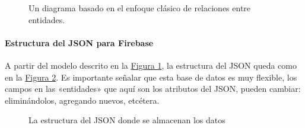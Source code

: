 \begin{figure}[htbp]
\centering
\capstart

\noindent{}
\caption{Un diagrama basado en el enfoque clásico de relaciones entre entidades.}\label{\detokenize{chapter_two/desc_cloudnao:entity-relationship-model-cn-firebase}}\end{figure}


\paragraph{Estructura del JSON para Firebase}
\label{\detokenize{chapter_two/desc_cloudnao:estructura-del-json-para-firebase}}

A partir del modelo descrito en la \hyperref[\detokenize{chapter_two/desc_cloudnao:entity-relationship-model-cn-firebase}]{Figura \ref{\detokenize{chapter_two/desc_cloudnao:entity-relationship-model-cn-firebase}}}, la estructura del JSON
queda como en la \hyperref[\detokenize{chapter_two/desc_cloudnao:json-structure}]{Figura \ref{\detokenize{chapter_two/desc_cloudnao:json-structure}}}. Es importante señalar que esta base de datos
es muy flexible, los campos en las «entidades» que aquí son los atributos
del JSON, pueden cambiar: eliminándolos, agregando nuevos, etcétera.

\begin{figure}[htbp]
\centering
\capstart

\noindent{}
\caption{La estructura del JSON donde se almacenan los datos}\label{\detokenize{chapter_two/desc_cloudnao:json-structure}}\end{figure}

